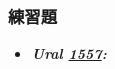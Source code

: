 \subsubsection*{練習題}
\begin{itemize}[label={\Checkmark}]
\item \textbf{\textit{Ural \href{http://acm.timus.ru/problem.aspx?num=1557}{1557}: }}\\

\end{itemize}